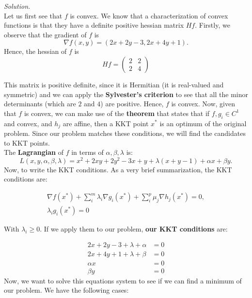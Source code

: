 \documentclass[a4paper]{article}
\newenvironment{solution}
    {\textit{Solution.}\\}
    {}
\begin{document}
\begin{solution}
Let us first see that \(f\) is convex. We know that a characterization of convex functions is that they have a definite positive hessian matrix \(Hf\). Firstly, we observe that the gradient of \(f\) is
\[
\nabla f(x,y) = \left( 2x + 2y - 3, 2x + 4y + 1\right).
\]
Hence, the hessian of \(f\) is
\[
Hf = \begin{pmatrix} 2 & 2 \\ 2 & 4 \end{pmatrix}
\]

This matrix is positive definite, since it is Hermitian (it is real-valued and symmetric) and we can apply the \textbf{Sylvester's criterion} to see that all the minor determinants (which are \(2\) and \(4\)) are positive. Hence, \(f\) is convex. Now, given that \(f\) is convex, we can make use of the \textbf{theorem} that states that if \(f,g_{i} \in C^{1}\) and convex, and \(h_{j}\) are affine, then a KKT point \(x^{*}\) is an optimum of the original problem. Since our problem matches these conditions, we will find the candidates to KKT points.\\

The \textbf{Lagrangian} of \(f\) in terms of \(\alpha,\beta,\lambda\) is:
\[
  L(x,y,\alpha,\beta,\lambda) = x^{2} + 2xy + 2y^{2} - 3x + y + \lambda(x+y - 1) + \alpha x + \beta y .
\]
Now, to write the KKT conditions. As a very brief summarization, the KKT conditions are:

\begin{align*}
  \nabla f(x^{*}) + \sum_{i}^m\lambda_{i} \nabla g_{i}(x^*) + \sum_{i}^p\mu_{j} \nabla h_{j}(x^*) = 0, \\
  \lambda_{i}g_{i}(x^*) = 0
\end{align*}



With \(\lambda_{i} \geq 0\). If we apply them to our problem, \textbf{our KKT conditions} are:

\begin{align*}
  2x + 2y - 3 + \lambda + \alpha & = 0 \\
 2x + 4y + 1 +  \lambda + \beta  & = 0 \\
  \alpha x                                                    & = 0 \\
  \beta y                                                     & = 0
\end{align*}
Now, we want to solve this equations system to see if we can find a minimum of our problem. We have the following cases:


\end{solution}
\end{document}
